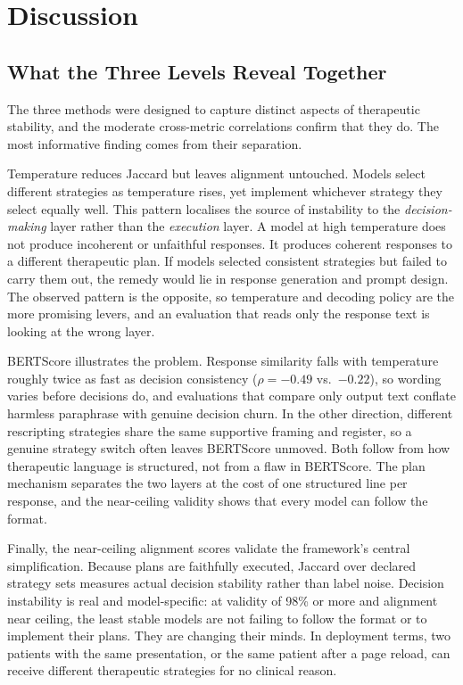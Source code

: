 \section{Discussion}
\label{sec:discussion}

\subsection{What the Three Levels Reveal Together}

The three methods were designed to capture distinct aspects of therapeutic stability, and the moderate cross-metric correlations confirm that they do. The most informative finding comes from their separation.

Temperature reduces Jaccard but leaves alignment untouched. Models select different strategies as temperature rises, yet implement whichever strategy they select equally well. This pattern localises the source of instability to the \emph{decision-making} layer rather than the \emph{execution} layer. A model at high temperature does not produce incoherent or unfaithful responses. It produces coherent responses to a different therapeutic plan. If models selected consistent strategies but failed to carry them out, the remedy would lie in response generation and prompt design. The observed pattern is the opposite, so temperature and decoding policy are the more promising levers, and an evaluation that reads only the response text is looking at the wrong layer.

BERTScore illustrates the problem. Response similarity falls with temperature roughly twice as fast as decision consistency ($\rho=-0.49$ vs.\ $-0.22$), so wording varies before decisions do, and evaluations that compare only output text conflate harmless paraphrase with genuine decision churn. In the other direction, different rescripting strategies share the same supportive framing and register, so a genuine strategy switch often leaves BERTScore unmoved. Both follow from how therapeutic language is structured, not from a flaw in BERTScore. The plan mechanism separates the two layers at the cost of one structured line per response, and the near-ceiling validity shows that every model can follow the format.

Finally, the near-ceiling alignment scores validate the framework's central simplification. Because plans are faithfully executed, Jaccard over declared strategy sets measures actual decision stability rather than label noise. Decision instability is real and model-specific: at validity of 98\% or more and alignment near ceiling, the least stable models are not failing to follow the format or to implement their plans. They are changing their minds. In deployment terms, two patients with the same presentation, or the same patient after a page reload, can receive different therapeutic strategies for no clinical reason.

